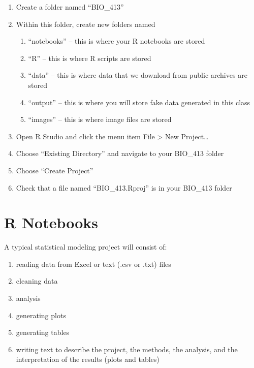 \documentclass[]{book}
\providecommand{\tightlist}{%
  \setlength{\itemsep}{0pt}\setlength{\parskip}{0pt}}
\begin{document}
\begin{enumerate}
\def\labelenumi{\arabic{enumi}.}
\tightlist
\item
  Create a folder named ``BIO\_413''
\item
  Within this folder, create new folders named

  \begin{enumerate}
  \def\labelenumii{\arabic{enumii}.}
  \tightlist
  \item
    ``notebooks'' -- this is where your R notebooks are stored
  \item
    ``R'' -- this is where R scripts are stored
  \item
    ``data'' -- this is where data that we download from public archives
    are stored
  \item
    ``output'' -- this is where you will store fake data generated in
    this class
  \item
    ``images'' -- this is where image files are stored
  \end{enumerate}
\item
  Open R Studio and click the menu item File \textgreater{} New
  Project\ldots{}
\item
  Choose ``Existing Directory'' and navigate to your BIO\_413 folder
\item
  Choose ``Create Project''
\item
  Check that a file named ``BIO\_413.Rproj'' is in your BIO\_413 folder
\end{enumerate}

\section{R Notebooks}\label{r-notebooks}

A typical statistical modeling project will consist of:

\begin{enumerate}
\def\labelenumi{\arabic{enumi}.}
\tightlist
\item
  reading data from Excel or text (.csv or .txt) files
\item
  cleaning data
\item
  analysis
\item
  generating plots
\item
  generating tables
\item
  writing text to describe the project, the methods, the analysis, and
  the interpretation of the results (plots and tables)
\end{enumerate}
\end{document}
